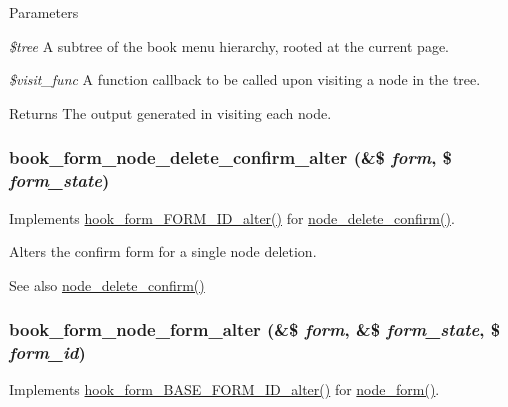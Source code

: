 \begin{DoxyParams}{Parameters}
\item[{\em \$tree}]A subtree of the book menu hierarchy, rooted at the current page. \item[{\em \$visit\_\-func}]A function callback to be called upon visiting a node in the tree.\end{DoxyParams}
\begin{DoxyReturn}{Returns}
The output generated in visiting each node. 
\end{DoxyReturn}
\hypertarget{book_8module_a0b42d6b8b360c3fde824b6966e11eb0c}{
\subsubsection[{book\_\-form\_\-node\_\-delete\_\-confirm\_\-alter}]{\setlength{\rightskip}{0pt plus 5cm}book\_\-form\_\-node\_\-delete\_\-confirm\_\-alter (\&\$ {\em form}, \/  \$ {\em form\_\-state})}}
\label{book_8module_a0b42d6b8b360c3fde824b6966e11eb0c}
Implements \hyperlink{group__hooks_ga8d4a4089551493d55911bd5c4f218264}{hook\_\-form\_\-FORM\_\-ID\_\-alter()} for \hyperlink{node_8pages_8inc_a6394c9476a3cbc56ba6130755f99497e}{node\_\-delete\_\-confirm()}.

Alters the confirm form for a single node deletion.

\begin{DoxySeeAlso}{See also}
\hyperlink{node_8pages_8inc_a6394c9476a3cbc56ba6130755f99497e}{node\_\-delete\_\-confirm()} 
\end{DoxySeeAlso}
\hypertarget{book_8module_a239587a26d87e8231f7af9953a1db4dd}{
\subsubsection[{book\_\-form\_\-node\_\-form\_\-alter}]{\setlength{\rightskip}{0pt plus 5cm}book\_\-form\_\-node\_\-form\_\-alter (\&\$ {\em form}, \/  \&\$ {\em form\_\-state}, \/  \$ {\em form\_\-id})}}
\label{book_8module_a239587a26d87e8231f7af9953a1db4dd}
Implements \hyperlink{group__hooks_gaf0cfc224a88c8823da68856c30a4841a}{hook\_\-form\_\-BASE\_\-FORM\_\-ID\_\-alter()} for \hyperlink{group__forms_ga267299500e205db099ee4e8396769d3f}{node\_\-form()}.

